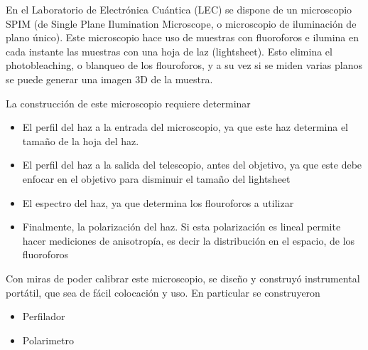     En el Laboratorio de Electrónica Cuántica (LEC) se dispone de un microscopio SPIM (de Single Plane Ilumination Microscope, o microscopio de iluminación de plano único). Este microscopio hace uso de muestras con fluoroforos e ilumina en cada instante las muestras con una hoja de laz (lightsheet). Esto elimina el photobleaching, o blanqueo de los flouroforos, y a su vez si se miden varias planos se puede generar una imagen 3D de la muestra.
        
    La construcción de este microscopio requiere determinar
    \begin{itemize}
        \item El perfil del haz a la entrada del microscopio, ya que este haz determina el tamaño de la hoja del haz.
        \item El perfil del haz a la salida del telescopio, antes del objetivo, ya que este debe enfocar en el objetivo para disminuir el tamaño del lightsheet
        \item El espectro del haz, ya que determina los flouroforos a utilizar
        \item Finalmente, la polarización del haz. Si esta polarización es lineal permite hacer mediciones de anisotropía, es decir la distribución en el espacio, de los fluoroforos
    \end{itemize}
            
    Con miras de poder calibrar este microscopio, se diseño y construyó instrumental portátil, que sea de fácil colocación y uso. En particular se construyeron
    \begin{itemize}
        \item Perfilador
        \item Polarimetro
    \end{itemize}



